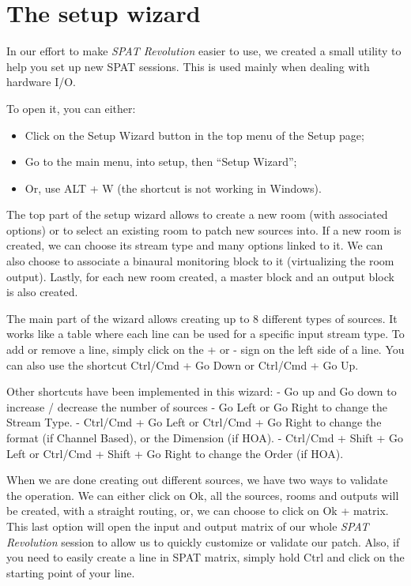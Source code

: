 \documentclass[
  letterpaper,
  DIV=11,
  numbers=noendperiod]{scrreport}
\providecommand{\tightlist}{%
  \setlength{\itemsep}{0pt}\setlength{\parskip}{0pt}}\usepackage{longtable,booktabs,array}
\begin{document}
\hypertarget{the-setup-wizard}{%
\section{The setup wizard}\label{the-setup-wizard}}

In our effort to make \emph{SPAT Revolution} easier to use, we created a
small utility to help you set up new SPAT sessions. This is used mainly
when dealing with hardware I/O.

To open it, you can either:

\begin{itemize}
\tightlist
\item
  Click on the Setup Wizard button in the top menu of the Setup page;
\item
  Go to the main menu, into setup, then ``Setup Wizard'';
\item
  Or, use ALT + W (the shortcut is not working in Windows).
\end{itemize}

The top part of the setup wizard allows to create a new room (with
associated options) or to select an existing room to patch new sources
into. If a new room is created, we can choose its stream type and many
options linked to it. We can also choose to associate a binaural
monitoring block to it (virtualizing the room output). Lastly, for each
new room created, a master block and an output block is also created.

The main part of the wizard allows creating up to 8 different types of
sources. It works like a table where each line can be used for a
specific input stream type. To add or remove a line, simply click on the
+ or - sign on the left side of a line. You can also use the shortcut
Ctrl/Cmd + Go Down or Ctrl/Cmd + Go Up.

Other shortcuts have been implemented in this wizard: - Go up and Go
down to increase / decrease the number of sources - Go Left or Go Right
to change the Stream Type. - Ctrl/Cmd + Go Left or Ctrl/Cmd + Go Right
to change the format (if Channel Based), or the Dimension (if HOA). -
Ctrl/Cmd + Shift + Go Left or Ctrl/Cmd + Shift + Go Right to change the
Order (if HOA).

When we are done creating out different sources, we have two ways to
validate the operation. We can either click on Ok, all the sources,
rooms and outputs will be created, with a straight routing, or, we can
choose to click on Ok + matrix. This last option will open the input and
output matrix of our whole \emph{SPAT Revolution} session to allow us to
quickly customize or validate our patch. Also, if you need to easily
create a line in SPAT matrix, simply hold Ctrl and click on the starting
point of your line.
\end{document}
